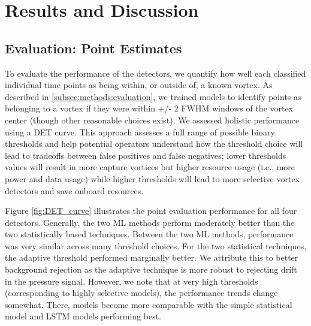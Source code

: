 \section{Results and Discussion}
\subsection{Evaluation: Point Estimates}
To evaluate the performance of the detectors, we quantify how well each classified individual time points as being within, or outside of, a known vortex.
As described in \ref{subsec:methods:evaluation}, we trained models to identify points as belonging to a vortex if they were within +/- 2 \acrshort{FWHM} windows of the vortex center (though other reasonable choices exist).
We assessed holistic performance using a \acrfull{DET} curve.
This approach assesses a full range of possible binary thresholds and help potential operators understand how the threshold choice will lead to tradeoffs between false positives and false negatives; lower thresholds values will result in more capture vortices but higher resource usage (i.e., more power and data usage) while higher thresholds will lead to more selective vortex detectors and save onboard resources.

Figure \ref{fig:DET_curve} illustrates the point evaluation performance for all four detectors.
Generally, the two \acrshort{ML} methods perform moderately better than the two statistically based techniques.
Between the two \acrshort{ML} methods, performance was very similar across many threshold choices.
For the two statistical techniques, the adaptive threshold performed marginally better.
We attribute this to better background rejection as the adaptive technique is more robust to rejecting drift in the pressure signal.
However, we note that at very high thresholds (corresponding to highly selective models), the performance trends change somewhat. 
There, models become more comparable with the simple statistical model and \acrshort{LSTM} models performing best.


